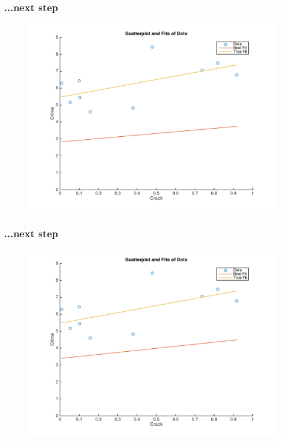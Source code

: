 \documentclass{beamer}
\begin{document}
\begin{frame}
\frametitle[alignment=center]{...next step}
\begin{figure}
\centering
\includegraphics[scale=0.5]{Newton_OLS_Figure_4.png}
\end{figure}
\end{frame}

\begin{frame}
\frametitle[alignment=center]{...next step}
\begin{figure}
\centering
\includegraphics[scale=0.5]{Newton_OLS_Figure_5.png}
\end{figure}
\end{frame}
\end{document}
